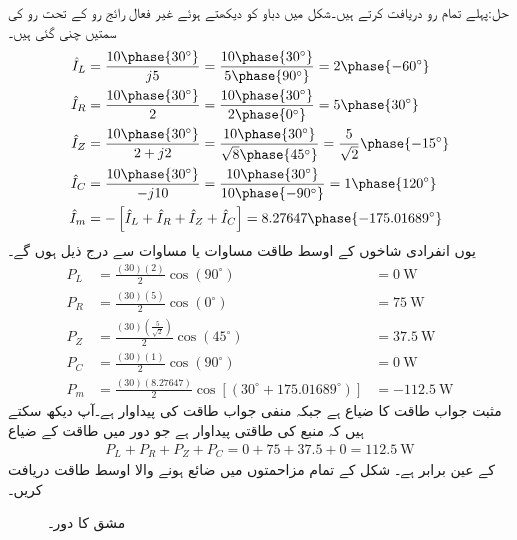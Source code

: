 حل:پہلے تمام رو دریافت کرتے ہیں۔شکل میں دباو کو دیکھتے ہوئے غیر فعال رائج رو کے تحت رو کی سمتیں چنی گئی ہیں۔ 
\begin{align*}
\hat{I}_L&=\frac{10\phase{30^{\circ}}}{j5}=\frac{10\phase{30^{\circ}}}{5\phase{90^{\circ}}}=2\phase{-60^{\circ}}\\
\hat{I}_R&=\frac{10\phase{30^{\circ}}}{2}=\frac{10\phase{30^{\circ}}}{2\phase{0^{\circ}}}=5\phase{30^{\circ}}\\
\hat{I}_Z&=\frac{10\phase{30^{\circ}}}{2+j2}=\frac{10\phase{30^{\circ}}}{\sqrt{8}\phase{45^{\circ}}}=\frac{5}{\sqrt{2}}\phase{-15^{\circ}}\\
\hat{I}_C&=\frac{10\phase{30^{\circ}}}{-j10}=\frac{10\phase{30^{\circ}}}{10\phase{-90^{\circ}}}=1\phase{120^{\circ}}\\
\hat{I}_m&=-\left[\hat{I}_L+\hat{I}_R+\hat{I}_Z+\hat{I}_C\right]=8.27647\phase{-175.01689^{\circ}}
\end{align*}
یوں انفرادی شاخوں کے اوسط طاقت مساوات  یا مساوات  سے درج ذیل ہوں گے۔
\begin{align*}
P_L&=\frac{(30)(2)}{2}\cos(90^{\circ})&=\SI{0}{\watt}\\
P_R&=\frac{(30)(5)}{2}\cos(0^{\circ})&=\SI{75}{\watt}\\
P_Z&=\frac{(30)(\tfrac{5}{\sqrt{2}})}{2}\cos(45^{\circ})&=\SI{37.5}{\watt}\\
P_C&=\frac{(30)(1)}{2}\cos(90^{\circ})&=\SI{0}{\watt}\\
P_m&=\frac{(30)(8.27647)}{2}\cos[(30^{\circ}+175.01689^{\circ})]&=-\SI{112.5}{\watt}
\end{align*}
مثبت جواب طاقت کا ضیاع ہے جبکہ منفی جواب طاقت کی پیداوار ہے۔آپ دیکھ سکتے ہیں کہ منبع کی طاقتی پیداوار  ہے جو دور میں طاقت کے ضیاع 
\begin{align*}
P_L+P_R+P_Z+P_C=0+75+37.5+0=\SI{112.5}{\watt}
\end{align*}
کے عین برابر ہے۔
شکل  کے تمام مزاحمتوں میں ضائع ہونے والا اوسط طاقت دریافت کریں۔


\begin{figure}
\centering
{}
\caption{مشق  کا دور۔}
\label{شکل_طاقت_دریافت_کریں_الف}
\end{figure}

